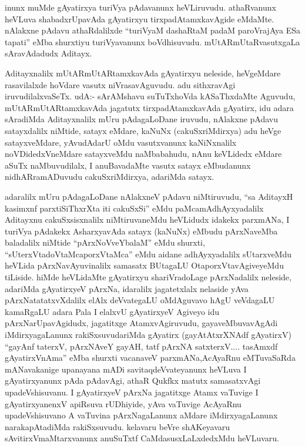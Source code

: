 \begin{artha}
inunx muMde gAyatirxya turiVya pAdavanunx heVLiruvudu. athaRvanunx heVLuva shabadxrUpavAda gAyatirxyu tirxpadAtamxkavAgide eMdaMte. nAlakxne pAdavu athaRdalilxde ``turiVyaM dashaRtaM padaM paroVrajAya ESa tapati'' eMba shurxtiyu turiVyavanunx boVdhisuvudu. mUtARmUtaRvasutxgaLa sAravAdadudx Aditayx. 

Aditayxnalilx mUtARmUtARtamxkavAda gAyatirxyu neleside, heVgeMdare rasavilalxde hoVdare vasutx niVrasavAguvudu. adu sithxravAgi iruvudilalxvaSeTx. udA:- sArAMshavu suTuTxhoVda kASaThxdaMte Aguvudu, mUtARmUtARtamxkavAda jagatutx tirxpadAtamxkavAda gAyatirx, idu adara sAradiMda Aditayxnalilx mUru pAdagaLoDane iruvudu, nAlakxne pAdavu satayxdalilx niMtide, satayx eMdare, kaNuNx (cakuSxriMdirxya) adu heVge satayxveMdare, yAvudAdarU oMdu vasutxvanunx kaNiNxnalilx noVDidedxVneMdare satayxveMdu naMbabahudu, nAnu keVLidedx eMdare aSuTx naMbuvudilalx, I anuBavadaMte vasutx satayx eMbudanunx nidhARramADuvudu cakuSxriMdirxya, adariMda satayx. 

adaralilx mUru pAdagaLoDane nAlakxneV pAdavu niMtiruvudu, ``sa AditayxH  kasimxnf parxtiSiThxrXta iti cakuSxSi'' eMdu paMcamAdhAyxyadalilx Aditayxnu cakuSxsisxnalilx niMtiruvaneMdu heVLidudx idakekx parxmANa, I turiVya pAdakekx AsharxyavAda satayx (kaNuNx) eMbudu pArxNaveMba baladalilx niMtide ``pArxNoVveYbalaM'' eMdu shurxti, ``sUterxVtadoVtaMca\-\break porxVtaMca'' eMdu aidane adhAyxyadalilx sUtarxveMdu heVLida pArxNavAyuvinalilx samasatx BUtagaLU OtaporxVtavAgiveyeMdu tiLiside. hiMde heVLidaMte gAyatirxyu shariVradoLage pArxNadalilx neleside, adariMda gAyatirxyeV pArxNa, idaralilx jagatetxlalx nelaside yAva pArxNatatatxvXdalilx elAlx deVvategaLU oMdAguvavo hAgU veVdagaLU kamaRgaLU adara Pala I elalxvU gAyatirxyeV Agiveyo idu pArxNarUpavAgidudx, jagatitxge AtamxvAgiruvudu, gayaveMbuvavAgAdi iMdirxyagaLanunx rakiSxsuvudariMda gAyatirx (gayAtAtxrXNAdf gAyatirxV) ``gayAnf taterxV, pArxNAveY gayAH, tatf pArxNA satxterxV.... tasAmxdf gAyatirxVnAma'' eMba shurxti vacanaveV parxmANa,\break AcAyaRnu eMTuvaSaRda mANavakanige upanayana mADi savitaqdeVvateyanunx heVLuva I gAyatirxyanunx pAda pAdavAgi, athaR Qukfkx matutx samasatxvAgi upadeVshisuvanu. I gAyatirxyeV pArxNa jagatitxge Atamx vaTuvige I gAyatirxyanenxV apiRsuva rUDhiyide, yAva vaTuvige AcAyaRnu upadeVshisuvano A vaTuvina pArxNagaLanunx aMdare iMdirxyagaLanunx narakapAtadiMda rakiSxsuvudu. kelavaru beVre shAKeyavaru sAvitirxVmaMtarxvanunx anuSuTxtf CaMdasusxLaLxdedxMdu heVLuvaru.
\end{artha}

